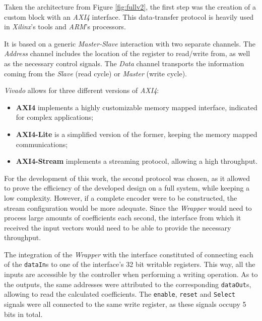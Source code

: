 
Taken the architecture from Figure \ref{fig:fullv2}, the first step was the creation of a custom block with an \emph{AXI4} interface. This data-transfer protocol is heavily used in \emph{Xilinx}'s tools and \emph{ARM}'s processors.

It is based on a generic \emph{Master-Slave} interaction with two separate channels. The \emph{Address} channel includes the location of the register to read/write from, as well as the necessary control signals. The \emph{Data} channel transports the information coming from the \emph{Slave} (read cycle) or \emph{Master} (write cycle). 

\emph{Vivado} allows for three different versions of \emph{AXI4}:

\begin{itemize}
    \item \textbf{AXI4} implements a highly customizable memory mapped interface, indicated for complex applications;
    \item \textbf{AXI4-Lite} is a simplified version of the former, keeping the memory mapped communications;
    \item \textbf{AXI4-Stream} implements a streaming protocol, allowing a high throughput.
\end{itemize}

For the development of this work, the second protocol was chosen, as it allowed to prove the efficiency of the developed design on a full system, while keeping a low complexity. However, if a complete encoder were to be constructed, the stream configuration would be more adequate. Since the \emph{Wrapper} would need to process large amounts of coefficients each second, the interface from which it received the input vectors would need to be able to provide the necessary throughput.

The integration of the \emph{Wrapper} with the interface constituted of connecting each of the \texttt{dataIn}s to one of the interface's 32 bit writable registers. This way, all the inputs are accessible by the controller when performing a writing operation. As to the outputs, the same addresses were attributed to the corresponding \texttt{dataOut}s, allowing to read the calculated coefficients. The \texttt{enable}, \texttt{reset} and \texttt{Select} signals were all connected to the same write register, as these signals occupy 5 bits in total.

